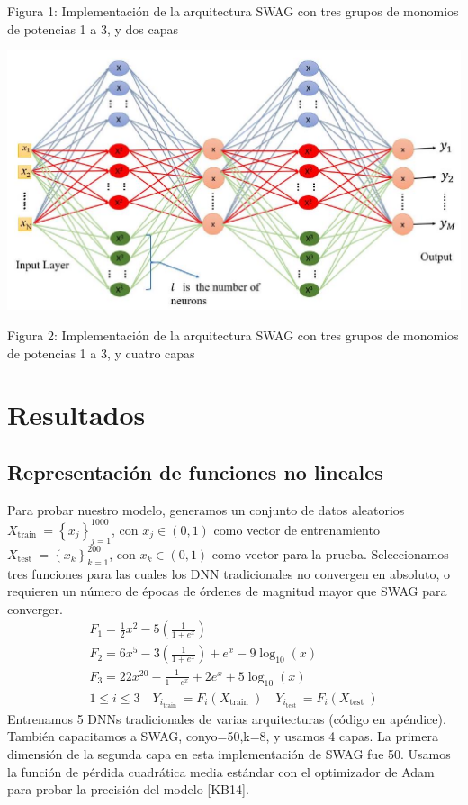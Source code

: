 \documentclass[10pt]{article}
\begin{document}
Figura 1: Implementación de la arquitectura SWAG con tres grupos de monomios de potencias 1 a 3, y dos capas

\includegraphics[max width=\textwidth]{2022_09_28_0067ec14010042dbf918g-05}

Figura 2: Implementación de la arquitectura SWAG con tres grupos de monomios de potencias 1 a 3, y cuatro capas

\section{Resultados}
\subsection{Representación de funciones no lineales}
Para probar nuestro modelo, generamos un conjunto de datos aleatorios $X_{\text {train }}=\left\{x_{j}\right\}_{j=1}^{1000}$, con $x_{j} \in(0,1)$ como vector de entrenamiento $X_{\text {test }}=\left\{x_{k}\right\}_{k=1}^{200}$, con $x_{k} \in(0,1)$ como vector para la prueba. Seleccionamos
tres funciones para las cuales los DNN tradicionales no convergen en absoluto, o requieren un número de épocas de órdenes de magnitud mayor que SWAG para converger.
$$
\begin{gathered}
F_{1}=\frac{1}{2} x^{2}-5\left(\frac{1}{1+e^{x}}\right) \\
F_{2}=6 x^{5}-3\left(\frac{1}{1+e^{x}}\right)+e^{x}-9 \log _{10}(x) \\
F_{3}=22 x^{20}-\frac{1}{1+e^{x}}+2 e^{x}+5 \log _{10}(x) \\
1 \leq i \leq 3 \quad Y_{i_{\text {train }}}=F_{i}\left(X_{\text {train }}\right) \quad Y_{i_{\text {test }}}=F_{i}\left(X_{\text {test }}\right)
\end{gathered}
$$
Entrenamos 5 DNNs tradicionales de varias arquitecturas (código en apéndice). También capacitamos a SWAG, conyo=50,k=8, y usamos 4 capas. La primera dimensión de la segunda capa en esta implementación de
SWAG fue 50. Usamos la función de pérdida cuadrática media estándar con el optimizador de Adam para probar la precisión del modelo [KB14].
\end{document}
